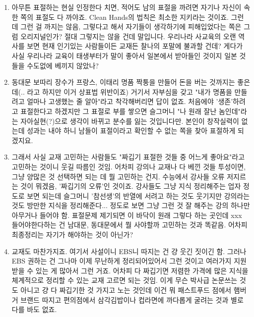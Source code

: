 \begin{enumerate}
    \item  아무튼 표절하는 현실 인정한다 치면, 적어도 남의 표절을 까려면 자기나 자신이 속한 쪽의 표절도 다 까야죠.
    Clean Hands의 법칙은 최소한 지키라는 것이죠. 그런데 그런 걸 까지는 않음,
    그렇다고 해서 자기들이 생각하기에 피해입었다는 쪽은 그럼 오리지널인가?
    절대 그렇지는 않을 건데 말입니다. 우리나라 사교육의 오랜 역사를 보면 현재 인기있는 사람들이든 교재든 찰나의 포말에 불과할 건데?
    게다가 사실 우리나라 교육이 태생부터가 말이 좋아서 일본에서 받아들인 것이지 일본 것들을 수도없에 베끼지 않았나?
    \vspace{5mm}

    \item  동대문 보따리 장수가 프랑스, 이태리 명품 짝퉁을 만들어 돈을 버는 것까지는 좋은데(.. 라고 하지만 이거 상표법 위반이죠)
    거기서 자부심을 갖고 "내가 명품을 만들려고 얼마나 고생했는 줄 알아"라고 착각해버리면 답이 없죠.
    처음에야 '생존'하려고 표절한다고 하겠지만 그 표절로 부를 쌓으면
    슬그머니 "나 원래 잘난 놈인데"라는 자아실현(?)으로 생각이 바뀌고 분수를 잃는 것입니다만.
    본인이 창작실력이 없는데 성과는 내야 하니 남들이 표절이라고 확인할 수 없는 쪽을 찾아 표절하게 되겠지요.
    \vspace{5mm}

    \item  그래서 사실 교재 고민하는 사람들도 "짜깁기 표절한 것들 중 어느게 좋아요"라고 고민하는 것이니 웃길 따름인 것임.
    어차피 강의나 교재나 다 베낀 것들 투성이면, 그냥 양많은 것 선택하면 되는 데 뭘 고민하는 건지.
    수능에서 강사들 오류 저지르는 것이 뭐겠음, '짜깁기의 오류'인 것이죠.
    강사들도 그냥 지식 정리해주는 업자 정도로 보면 되는데 슬그머니 '참선생'의 반열에 서려고 하는 것도 웃기지만
    강의라는 것도 방만한 지식을 정리해준다... 정도로 보면 그냥 그런 것 잘 해주는 강의 하나만 아무거나 들어야 함.
    표절문제 제기되면 이 바닥이 원래 그렇다 하는 곳인데 xxx 들어야한다하는 건 남대문, 동대문에서 뭘 사야할까 고민하는 것과 똑같음.
    어차피 최종정리는 자기가 해야하는 것이 아닌가?
    \vspace{5mm}

    \item  교재도 마찬가지죠. 여기서 사설이니 EBS니 따지는 건 걍 웃긴 짓이긴 함.
    그러나 EBS 권하는 건 그나마 이제 무난하게 정리되어있어서 그런 것이고 여러가지 지원받을 수 있는 게 많아서 그런 거죠.
    어차피 다 짜깁기면 저렴한 가격에 많은 지식을 체계적으로 정리할 수 있는 교재 고르면 되는 것임.
    이게 무슨 박사급 논문쓰는 것도 아니고 걍 다 짜깁기한 것 가지고 노는 것인데
    이건 뭐 패스트푸드 점에서 햄버거 브랜드 따지고 편의점에서 삼각김밥이나 컵라면에 까다롭게 굴려는 것과 별로 다를 바도 없죠.
    
\end{enumerate}





